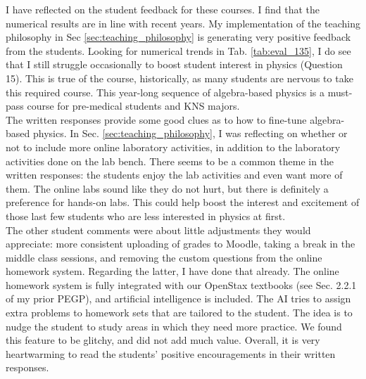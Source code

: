 \documentclass[../../main.tex]{subfiles}
\begin{document}
I have reflected on the student feedback for these courses.  I find that the numerical results are in line with recent years.  My implementation of the teaching philosophy in Sec \ref{sec:teaching_philosophy} is generating very positive feedback from the students.  Looking for numerical trends in Tab. \ref{tab:eval_135}, I do see that I still struggle occasionally to boost student interest in physics (Question 15).  This is true of the course, historically, as many students are nervous to take this required course.  This year-long sequence of algebra-based physics is a must-pass course for pre-medical students and KNS majors.
\\
\vspace{0.25cm}
The written responses provide some good clues as to how to fine-tune algebra-based physics.  In Sec. \ref{sec:teaching_philosophy}, I was reflecting on whether or not to include more online laboratory activities, in addition to the laboratory activities done on the lab bench.  There seems to be a common theme in the written responses: the students enjoy the lab activities and even want more of them.  The online labs sound like they do not hurt, but there is definitely a preference for hands-on labs.  This could help boost the interest and excitement of those last few students who are less interested in physics at first.
\\
\vspace{0.25cm}
The other student comments were about little adjustments they would appreciate: more consistent uploading of grades to Moodle, taking a break in the middle class sessions, and removing the custom questions from the online homework system.  Regarding the latter, I have done that already.  The online homework system is fully integrated with our OpenStax textbooks (see Sec. 2.2.1 of my prior PEGP), and artificial intelligence is included.  The AI tries to assign extra problems to homework sets that are tailored to the student.  The idea is to nudge the student to study areas in which they need more practice.  We found this feature to be glitchy, and did not add much value.  Overall, it is very heartwarming to read the students' positive encouragements in their written responses.
\end{document}
